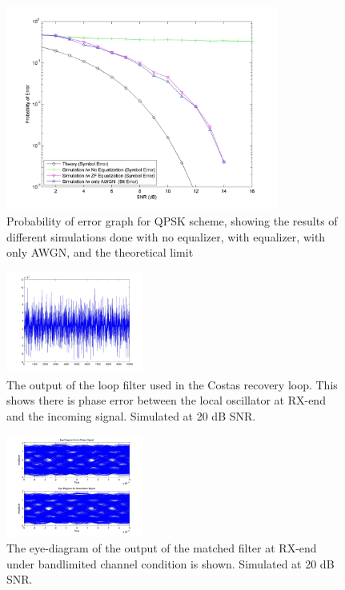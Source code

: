\documentclass[]{article}
\begin{document}
\begin{figure}[H]
\centering
\includegraphics[width=0.8\textwidth]{qpSNR.jpg}
\caption{Probability of error graph for QPSK scheme, showing the results of different simulations done with no equalizer, with equalizer, with only AWGN, and the theoretical limit \label{fig:qpBER}}
\end{figure}

\begin{figure}[H]
\centering
\includegraphics[width=0.4\textwidth]{loop_filter_qpsk20.jpg}
\caption{The output of the loop filter used in the Costas recovery loop.  This shows there is phase error between the local oscillator at RX-end and the incoming signal. Simulated at 20 dB SNR. \label{fig:qpLoop}}
\end{figure}

\begin{figure}[H]
\centering
\includegraphics[width=0.4\textwidth]{matched_eye_qpsk20.jpg}
\caption{The eye-diagram of the output of the matched filter at RX-end under bandlimited channel condition is shown. Simulated at 20 dB SNR. \label{fig:qpEyeMatch}}
\end{figure}
\end{document}

